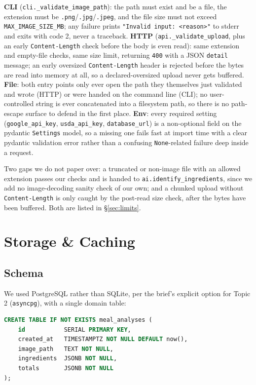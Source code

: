 \documentclass[11pt,a4paper]{article}
\begin{document}
\textbf{CLI} (\texttt{cli.\_validate\_image\_path}): the path must exist and be a file, the extension must be \texttt{.png}/\texttt{.jpg}/\texttt{.jpeg}, and the file size must not exceed \texttt{MAX\_IMAGE\_SIZE\_MB}; any failure prints \texttt{"Invalid input: <reason>"} to stderr and exits with code 2, never a traceback. \textbf{HTTP} (\texttt{api.\_validate\_upload}, plus an early \texttt{Content-Length} check before the body is even read): same extension and empty-file checks, same size limit, returning \texttt{400} with a JSON \texttt{detail} message; an early oversized \texttt{Content-Length} header is rejected before the bytes are read into memory at all, so a declared-oversized upload never gets buffered. \textbf{File}: both entry points only ever open the path they themselves just validated and wrote (HTTP) or were handed on the command line (CLI); no user-controlled string is ever concatenated into a filesystem path, so there is no path-escape surface to defend in the first place. \textbf{Env}: every required setting (\texttt{google\_api\_key}, \texttt{usda\_api\_key}, \texttt{database\_url}) is a non-optional field on the pydantic \texttt{Settings} model, so a missing one fails fast at import time with a clear pydantic validation error rather than a confusing \texttt{None}-related failure deep inside a request.

Two gaps we do not paper over: a truncated or non-image file with an allowed extension passes our checks and is handed to \texttt{ai.identify\_ingredients}, since we add no image-decoding sanity check of our own; and a chunked upload without \texttt{Content-Length} is only caught by the post-read size check, after the bytes have been buffered. Both are listed in \S\ref{sec:limits}.

\section{Storage \& Caching}\label{sec:storage}

\subsection{Schema}

We used PostgreSQL rather than SQLite, per the brief's explicit option for Topic 2 (\texttt{asyncpg}), with a single domain table:

\begin{lstlisting}[style=python,language=sql,numbers=none,basicstyle=\ttfamily\small]
CREATE TABLE IF NOT EXISTS meal_analyses (
    id           SERIAL PRIMARY KEY,
    created_at   TIMESTAMPTZ NOT NULL DEFAULT now(),
    image_path   TEXT NOT NULL,
    ingredients  JSONB NOT NULL,
    totals       JSONB NOT NULL
);
\end{lstlisting}
\end{document}
